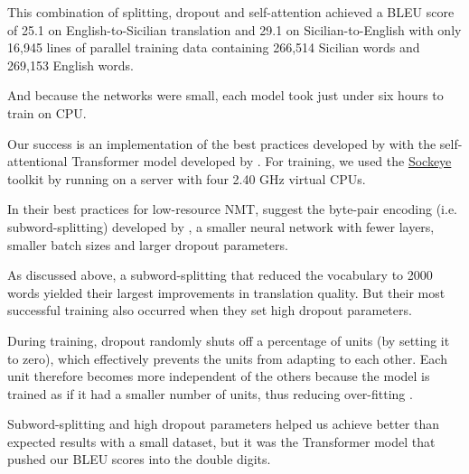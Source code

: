 \documentclass[10pt,letterpaper]{article}
\begin{document}
This combination of splitting, dropout and self-attention achieved a BLEU score of
25.1 on English-to-Sicilian translation and 29.1 on Sicilian-to-English with only 16,945 lines
of parallel training data containing 266,514 Sicilian words and 269,153 English words.

And because the networks were small, each model took just under six hours to train on CPU.
      
Our success is an implementation of the best practices developed by \citet{sennrich2019loresnmt}
with the self-attentional Transformer model developed by \citet{vaswani2017attention}.
For training, we used the \href{https://awslabs.github.io/sockeye/}{Sockeye} toolkit by
\citet{hieber2017sockeye} running on a server with four 2.40 GHz virtual CPUs.
      
In their best practices for low-resource NMT, \citeauthor{sennrich2019loresnmt}
suggest the byte-pair encoding (i.e. subword-splitting) developed by 
\citep{sennrich2016subword}, a smaller neural network with fewer layers,
smaller batch sizes and larger dropout parameters.

      

As discussed above, a subword-splitting that reduced the vocabulary to
2000 words yielded their largest improvements in translation quality.
But their most successful training also occurred when they set high dropout parameters.

During training, dropout randomly shuts off a percentage of units (by setting it to zero),
which effectively prevents the units from adapting to each other.
Each unit therefore becomes more independent of the others because the model is trained
as if it had a smaller number of units, thus reducing over-fitting
\citep{srivastava2014dropout}.

Subword-splitting and high dropout parameters helped us achieve better than expected results with
a small dataset, but it was the Transformer model that pushed our BLEU scores into the double digits.
\end{document}
